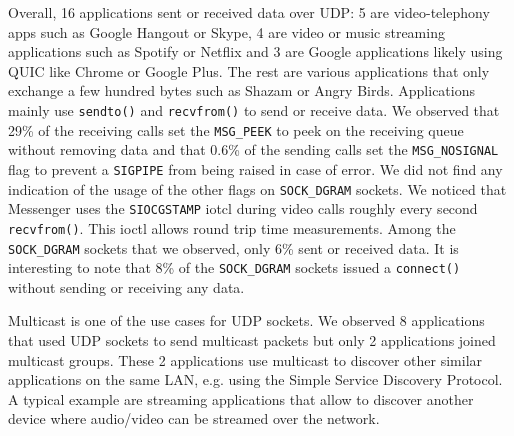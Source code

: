 Overall, 16 applications sent or received data over UDP: 5 are
video-telephony apps such as Google Hangout or Skype, 4 are video
or music streaming applications such as Spotify or Netflix and 3 are
Google applications likely using QUIC like Chrome or Google Plus. The rest
are various applications that only exchange a few hundred bytes such as
Shazam or Angry Birds. Applications mainly use \texttt{sendto()} and
\texttt{recvfrom()} to send or receive data. We observed that 29\% of the
receiving calls set the \texttt{MSG\_PEEK} to peek on the receiving queue without
removing data and that 0.6\% of the sending calls set the \texttt{MSG\_NOSIGNAL}
flag to prevent a \texttt{SIGPIPE} from being raised in case of error.
We did not find any indication of the usage of the other flags on
\texttt{SOCK\_DGRAM} sockets. We noticed that Messenger uses the
\texttt{SIOCGSTAMP} iotcl during video calls roughly every second
\texttt{recvfrom()}. This ioctl allows round trip time measurements. Among the
\texttt{SOCK\_DGRAM} sockets that we observed, only 6\% sent or received data.
It is interesting to note that 8\% of the \texttt{SOCK\_DGRAM} sockets issued
a \texttt{connect()} without sending or receiving any data.

Multicast is one of the use cases for UDP sockets. We observed 8
applications that used UDP sockets to send multicast packets but
only 2 applications joined multicast groups. These 2 applications use
multicast to discover other similar applications on the same LAN, e.g.
using the Simple Service Discovery Protocol. A typical example are
streaming applications that allow to discover another device where
audio/video can be streamed over the network.
